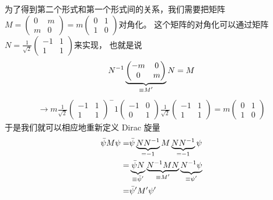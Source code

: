为了得到第二个形式和第一个形式间的关系，我们需要把矩阵$M=\begin{pmatrix}0&m\\m&0\end{pmatrix}=m\begin{pmatrix}0&1\\1&0\end{pmatrix}$对角化。
这个矩阵的对角化可以通过矩阵$N=\frac{1}{\sqrt{2}}\begin{pmatrix}-1&1\\1&1\end{pmatrix}$来实现，
也就是说
\begin{align}
  N^{-1}\underbrace{\begin{pmatrix}-m&0\\0&m\end{pmatrix}}_{\mathclap{\equiv M'}}N=M
\end{align}
\begin{align}
  \rightarrow m\frac{1}{\sqrt{2}}\begin{pmatrix}-1&1\\1&1\end{pmatrix}^-1\begin{pmatrix}-1&0\\0&1\end{pmatrix}\frac{1}{\sqrt{2}}
  \begin{pmatrix}-1&1\\1&1\end{pmatrix}=m\begin{pmatrix}0&1\\1&0\end{pmatrix}
\end{align}
于是我们就可以相应地重新定义 Dirac 旋量
\begin{align}
\begin{split}
  \bar{\psi}M\psi=&\bar{\psi}\underbrace{NN^{-1}}_{\mathclap{=-1}}M\underbrace{NN^{-1}}_{\mathclap{=-1}}\psi\\
  =&\underbrace{\bar{\psi}N}_{\mathclap{\equiv\bar{\psi}'}}
  \underbrace{N^{-1}MN}_{\mathclap{\equiv M'}}\underbrace{N^{-1}\psi}_{\mathclap{\equiv\psi'}}\\
  =&\bar{\psi}'M'\psi'
  \end{split}
\end{align}

